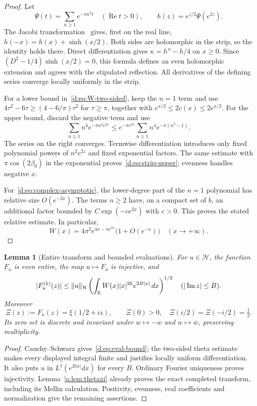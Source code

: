 \documentclass[11pt,a4paper]{article}
\numberwithin{equation}{section}
\newtheorem{lemma}[theorem]{Lemma}
\theoremstyle{definition}\newtheorem{definition}[theorem]{Definition}
\theoremstyle{remark}\newtheorem{remark}[theorem]{Remark}
\newcommand{\R}{\mathbb R}\newcommand{\C}{\mathbb C}\newcommand{\N}{\mathbb N}
\newcommand{\Hh}{\mathcal H}\newcommand{\Hw}{\mathcal H}
\begin{document}
\begin{proof}
Let
\[
 \Psi(t)=\sum_{n\ge1}e^{-\pi n^2t}\quad(\operatorname{Re}t>0),\qquad
 h(z)=e^{z/2}\Psi(e^{2z}).
\]
The Jacobi transformation~\cite[Eq.~20.7.32]{DLMF} gives, first on the real line,
$h(-x)=h(x)+\sinh(x/2)$. Both sides are holomorphic in the strip, so the identity holds there. Direct differentiation gives
$\kappa=h''-h/4$ on $x\ge0$. Since $(D^2-1/4)\sinh(x/2)=0$, this formula defines an even holomorphic extension and agrees with the stipulated reflection. All derivatives of the defining series converge locally uniformly in the strip.

For a lower bound in~\eqref{d:eq:W-two-sided}, keep the $n=1$ term and use
$4\tau^2-6\tau\ge(4-6/\pi)\tau^2$ for $\tau\ge\pi$, together with
$e^{x/2}\le2c(x)\le2e^{x/2}$. For the upper bound, discard the negative term and use
\[
 \sum_{n\ge1} n^4e^{-\pi n^2e^{2x}}
 \le e^{-\pi e^{2x}}\sum_{n\ge1}n^4e^{-\pi(n^2-1)}.
\]
The series on the right converges. Termwise differentiation introduces only fixed polynomial powers of $n^2e^{2z}$ and fixed exponential factors. The same estimate with $\pi\cos(2\beta_0)$ in the exponential proves~\eqref{d:eq:strip-upper}; evenness handles negative $x$.

For~\eqref{d:eq:complex-asymptotic}, the lower-degree part of the $n=1$ polynomial has relative size $O(e^{-2x})$. The terms $n\ge2$ have, on a compact set of $b$, an additional factor bounded by $C\exp(-c e^{2x})$ with $c>0$. This proves the stated relative estimate. In particular,
\begin{equation}\label{d:eq:W-asymptotic}
 W(x)=4\pi^2e^{4x-\pi e^{2x}}\bigl(1+O(e^{-x})\bigr)
 \quad(x\to+\infty).
\end{equation}
\end{proof}


\begin{lemma}[Entire transform and bounded evaluations]\label{d:lem:Fourier}
For $u\in\Hh$, the function $F_u$ is even entire, the map $u\mapsto F_u$ is injective, and
\begin{equation}\label{d:eq:eval-bound}
 |F_u^{(k)}(z)|\le\norm u_{\Hh}
 \left(\int_\R W(x)|x|^{2k}e^{2B|x|}\,dx\right)^{1/2}
 \quad (|\operatorname{Im}z|\le B).
\end{equation}
Moreover
\begin{equation}\label{d:eq:Xi-xi}
 \Xi(z):=F_\kappa(z)=\xi(1/2+iz),\qquad
 \Xi(0)>0,\quad \Xi(i/2)=\Xi(-i/2)=\tfrac12.
\end{equation}
Its zero set is discrete and invariant under $w\mapsto-w$ and $w\mapsto\overline w$, preserving multiplicity.
\end{lemma}
\begin{proof}
Cauchy--Schwarz gives~\eqref{d:eq:eval-bound}; the two-sided theta estimate makes every displayed integral finite and justifies locally uniform differentiation. It also puts $u$ in $L^1(e^{B|x|}dx)$ for every $B$. Ordinary Fourier uniqueness proves injectivity. Lemma~\ref{a:lem:thetaxi} already proves the exact completed transform, including its Mellin calculation. Positivity, evenness, real coefficients and normalization give the remaining assertions.
\end{proof}
\end{document}
